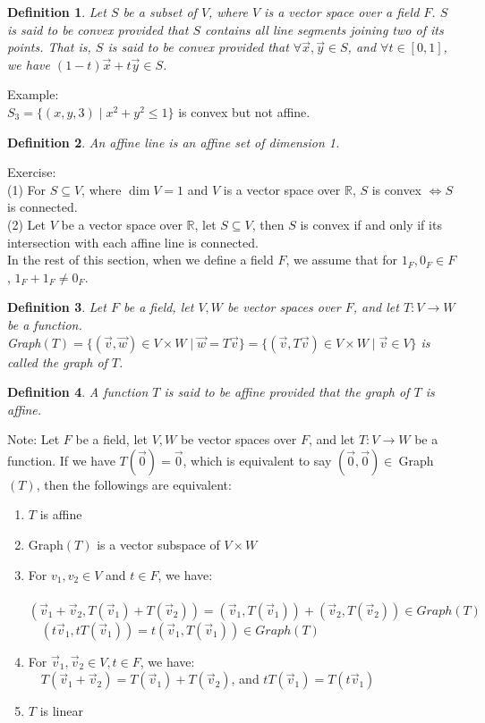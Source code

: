 \documentclass[11pt,oneside]{book}
\theoremstyle{break}
\theoremstyle{break}
\newtheorem{defn}{Definition}[corL]
\newcommand{\R}{\mathbb{R}}
\newcommand{\note}{\color{red}Note: \color{black}}
\newcommand{\example}{\color{green}Example: \color{black}}
\newcommand{\exercise}{\color{green}Exercise: \color{black}}
\begin{document}
\begin{defn}
Let $S$ be a subset of $V$, where $V$ is a vector space over a field $F$. $S$ is said to be convex provided that $S$ contains all line segments joining two of its points. That is, $S$ is said to be convex provided that $\forall \vec{x},\vec{y}\in S$, and $\forall t \in [0,1]$, we have $(1-t)\vec{x}+t\vec{y}\in S$.
\end{defn}

\example\\
$S_3 = \{ (x,y,3)\mid x^2+y^2\leq 1\}$ is convex but not affine.\\

\begin{defn}
An affine line is an affine set of dimension 1.
\end{defn}

\exercise\\
(1) For $S \subseteq V$, where $\dim V = 1$ and $V$ is a vector space over $\R$, $S$ is convex $\iff S$ is connected. \\
(2) Let $V$ be a vector space over $\R$, let $S \subseteq V$, then $S$ is convex if and only if its intersection with each affine line is connected.\\

In the rest of this section, when we define a field $F$, we assume that for $1_F,0_F \in F$, $1_F+1_F \neq 0_F$.

\begin{defn}
Let $F$ be a field, let $V,W$ be vector spaces over $F$, and let $T:V\to W$ be a function. \\Graph$(T) = \{(\vec{v}, \vec{w}) \in V\times W\mid \vec{w} = T\vec{v}\} = \{(\vec{v},T\vec{v})\in V\times W \mid \vec{v}\in V\}$ is called the graph of $T$.
\end{defn}

\begin{defn}
A function $T$ is said to be affine provided that the graph of $T$ is affine.
\end{defn}
\hfill\break
\note Let $F$ be a field, let $V,W$ be vector spaces over $F$, and let $T:V\to W$ be a function. If we have $T(\vec{0}) = \vec{0}$, which is equivalent to say $(\vec{0},\vec{0})\in\ $Graph$(T)$, then the followings are equivalent:
\begin{enumerate}[topsep=3pt,itemsep=-1ex,partopsep=1ex,parsep=1ex]
\item $T$ is affine
\item Graph$(T)$ is a vector subspace of $V\times W$
\item For $v_1,v_2 \in V$ and $t \in F$, we have:\\${}$\ \ $(\vec{v}_1+\vec{v}_2, T(\vec{v}_1)+T(\vec{v}_2)) = (\vec{v}_1,T(\vec{v}_1))+(\vec{v}_2,T(\vec{v}_2)) \in Graph(T)$\\${}$\ \ $(t\vec{v}_1,tT(\vec{v}_1)) = t(\vec{v}_1,T(\vec{v}_1)) \in Graph(T)$
\item For $\vec{v}_1,\vec{v}_2\in V, t\in F$, we have:\\${}$\ \  $T(\vec{v}_1+\vec{v}_2) = T(\vec{v}_1)+T(\vec{v}_2)$, and $tT(\vec{v}_1) = T(t\vec{v}_1)$
\item $T$ is linear
\end{enumerate}
\end{document}
